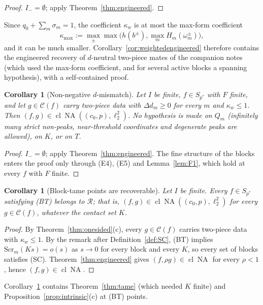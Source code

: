 \documentclass[10pt]{amsart}
\newtheorem{corollary}[theorem]{Corollary}
\theoremstyle{definition}
\theoremstyle{remark}
\newcommand{\NA}{\operatorname{NA}}
\newcommand{\Cset}{\mathcal C}
\newcommand{\cl}{\operatorname{cl}}
\newcommand{\Rec}{\mathcal R}
\begin{document}
\begin{proof}
$I_-=\emptyset$; apply Theorem~\ref{thm:engineered}.
\end{proof}

Since $q_0+\sum_m\sigma_m=1$, the coefficient $\kappa_w$ is at most the
max-form coefficient
\[
 \kappa_{\max}:=\max_\pm\max\big(h(b^\pm),\max_mH_m(\omega^\pm_m)\big),
\]
and it can be much smaller.  Corollary~\ref{cor:weightedengineered} therefore contains the
engineered recovery of $d$-neutral two-piece mates of the companion notes
(which used the max-form coefficient, and for several active blocks a
spanning hypothesis), with a self-contained proof.

\begin{corollary}[Non-negative $d$-mismatch]\label{cor:D1}
Let $I$ be finite, $f\in S_{p^*}$ with $F$ finite, and let $g\in\Cset(f)$
carry two-piece data with $\Delta d_m\ge0$ for every $m$ and $\kappa_w\le1$.
Then $(f,g)\in\cl\NA((c_0,p),\ell_2^2)$.  No hypothesis is made on $Q_m$
\textup{(}infinitely many strict non-peaks, near-threshold coordinates and
degenerate peaks are allowed\textup{)}, on $K$, or on $T$.
\end{corollary}

\begin{proof}
$I_-=\emptyset$; apply Theorem~\ref{thm:engineered}.  The fine structure of
the blocks enters the proof only through (E4), (E5) and
Lemma~\ref{lem:F1}, which hold at every $f$ with $F$ finite.
\end{proof}

\begin{corollary}[Block-tame points are recoverable]\label{cor:BTrecovered}
Let $I$ be finite.  Every $f\in S_{p^*}$ satisfying \textup{(BT)} belongs to
$\Rec$; that is, $(f,g)\in\cl\NA((c_0,p),\ell_2^2)$ for every
$g\in\Cset(f)$, whatever the contact set $K$.
\end{corollary}

\begin{proof}
By Theorem~\ref{thm:onesided}(c), every $g\in\Cset(f)$ carries two-piece
data with $\kappa_w\le1$.  By the remark after Definition~\ref{def:SC},
\textup{(BT)} implies $\mathrm{Scr}_m(Ks)=o(s)$ as $s\to0$ for every block
and every $K$, so every set of blocks satisfies \textup{(SC)}.
Theorem~\ref{thm:engineered} gives $(f,\rho g)\in\cl\NA$ for every
$\rho<1$, hence $(f,g)\in\cl\NA$.
\end{proof}

Corollary~\ref{cor:BTrecovered} contains Theorem~\ref{thm:tame}
(which needed $K$ finite) and Proposition~\ref{prop:intrinsic}(c) at
\textup{(BT)} points.
\end{document}
